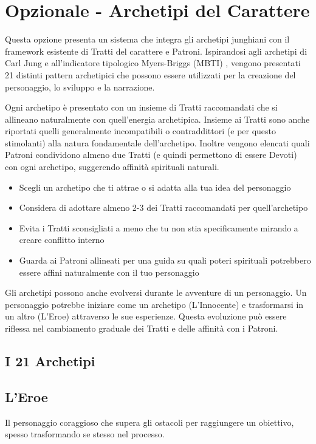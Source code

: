 \section{Opzionale - Archetipi del Carattere}

\begin{multicols}{2}

Questa opzione presenta un sistema che integra gli archetipi junghiani \autocite{jung1971} con il framework esistente di Tratti del carattere e Patroni. Ispirandosi agli archetipi di Carl Jung e all'indicatore tipologico Myers-Briggs (MBTI) \autocite{myers1995}, vengono presentati 21 distinti pattern archetipici che possono essere utilizzati per la creazione del personaggio, lo sviluppo e la narrazione.

Ogni archetipo è presentato con un insieme di Tratti raccomandati che si allineano naturalmente con quell'energia archetipica. Insieme ai Tratti sono anche riportati quelli  generalmente incompatibili o contraddittori (e per questo stimolanti) alla natura fondamentale dell'archetipo. Inoltre vengono elencati quali Patroni condividono almeno due Tratti (e quindi permettono di essere Devoti) con ogni archetipo, suggerendo affinità spirituali naturali.

\begin{itemize}
\item Scegli un archetipo che ti attrae o si adatta alla tua idea del personaggio
\item Considera di adottare almeno 2-3 dei Tratti raccomandati per quell'archetipo
\item Evita i Tratti sconsigliati a meno che tu non stia specificamente mirando a creare conflitto interno
\item Guarda ai Patroni allineati per una guida su quali poteri spirituali potrebbero essere affini naturalmente con il tuo personaggio
\end{itemize}

Gli archetipi possono anche evolversi durante le avventure di un personaggio. Un personaggio potrebbe iniziare come un archetipo (L'Innocente) e trasformarsi in un altro (L'Eroe) attraverso le sue esperienze. Questa evoluzione può essere riflessa nel cambiamento graduale dei Tratti e delle affinità con i Patroni.

\subsection*{I 21 Archetipi}

\subsection*{L'Eroe}
Il personaggio coraggioso che supera gli ostacoli per raggiungere un obiettivo, spesso trasformando se stesso nel processo.


\end{multicols}
